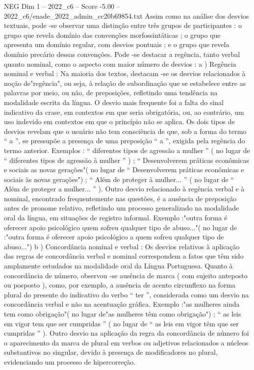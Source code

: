 \begin{textsample}{NEG Dim 1 – 2022\_c6 – Score -5.00 – 2022\_c6/enade\_2022\_admin\_cc20b69854.txt}
Assim como na análise dos desvios textuais, pode -se observar uma distinção entre três grupos de participantes : o grupo que revela domínio das convenções morfossintáticas ; o grupo que apresenta um domínio regular, com desvios pontuais ; e o grupo que revela domínio precário dessas convenções.
Pode -se destacar a regência, tanto verbal quanto nominal, como o aspecto com maior número de desvios : a ) Regência nominal e verbal : Na maioria dos textos, destacam -se os desvios relacionados à noção de"regência", ou seja, à relação de subordinação que se estabelece entre as palavras por meio, ou não, de preposições, refletindo uma tendência na modalidade escrita da língua.
O desvio mais frequente foi a falta do sinal indicativo da crase, em contextos em que seria obrigatória, ou, ao contrário, um uso indevido em contextos em que o princípio não se aplica.
Os dois tipos de desvios revelam que o usuário não tem consciência de que, sob a forma do termo “ a ”, se pressupõe a presença de uma preposição “ a ”, exigida pela regência do termo anterior.
Exemplos : “ diferentes tipos de agressão a mulher ” ( no lugar de “ diferentes tipos de agressão à mulher ” ) ; “ Desenvolverem práticas econômicas e sociais as novas gerações"( no lugar de “ Desenvolverem práticas econômicas e sociais às novas gerações") ; “ Além de proteger à mulher... ” ( no lugar de “ Além de proteger a mulher... ” ).
Outro desvio relacionado à regência verbal e à nominal, encontrado frequentemente nas questões, é a ausência de preposição antes de pronome relativo, refletindo um processo generalizado na modalidade oral da língua, em situações de registro informal.
Exemplo :"outra forma é oferecer apoio psicológico quem sofreu qualquer tipo de abuso..."( no lugar de :"outra forma é oferecer apoio psicológico a quem sofreu qualquer tipo de abuso...") b ) Concordância nominal e verbal : Os desvios relativos à aplicação das regras de concordância verbal e nominal correspondem a fatos que têm sido amplamente estudados na modalidade oral da Língua Portuguesa.
Quanto à concordância de número, observou -se ausência de marca ( com sujeito anteposto ou posposto ), como, por exemplo, a ausência de acento circunflexo na forma plural do presente do indicativo do verbo “ ter ”, considerada como um desvio na concordância verbal e não na acentuação gráfica.
Exemplo :"as mulheres ainda tem como obrigação"( no lugar de"as mulheres têm como obrigação") ; “ as leis em vigor tem que ser cumpridas ” ( no lugar de “ as leis em vigor têm que ser cumpridas ” ).
Outro desvio na aplicação da regra da concordância de número foi o aparecimento da marca de plural em verbos ou adjetivos relacionados a núcleos substantivos no singular, devido à presença de modificadores no plural, evidenciando um processo de hipercorreção.

\end{textsample}
